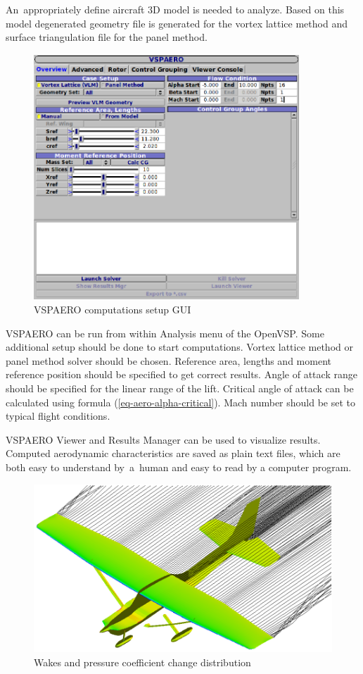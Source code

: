 An appropriately define aircraft 3D model is needed to analyze. \cite{Litherland2015-2} Based on this model degenerated geometry file is generated for the vortex lattice method and surface triangulation file for the panel method.

\begin{figure}
  \centering
  \includegraphics[width=100mm]{eps/vspaero_02.eps}
  \caption{VSPAERO computations setup GUI}
\end{figure}

VSPAERO can be run from within Analysis menu of the OpenVSP. Some additional setup should be done to start computations. Vortex lattice method or panel method solver should be chosen. Reference area, lengths and moment reference position should be specified to get correct results. Angle of attack range should be specified for the linear range of the lift. Critical angle of attack can be calculated using formula (\ref{eq-aero-alpha-critical}). Mach number should be set to typical flight conditions.

VSPAERO Viewer and Results Manager can be used to visualize results. Computed aerodynamic characteristics are saved as plain text files, which are both easy to understand by a human and easy to read by a computer program.

\begin{figure}
  \centering
  \includegraphics[width=120mm]{eps/vspaero_03.eps}
  \caption{Wakes and pressure coefficient change distribution}
\end{figure}

